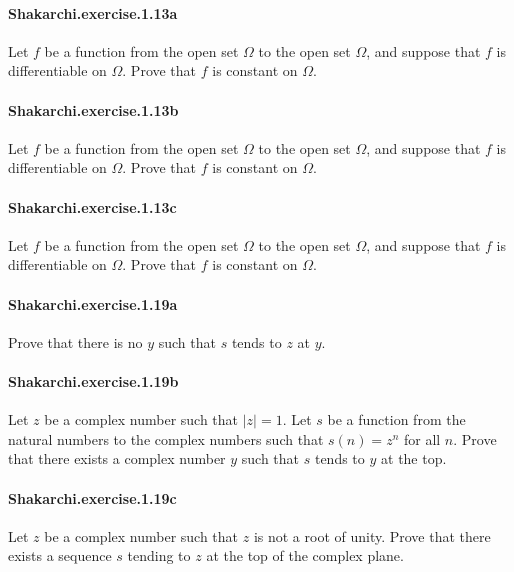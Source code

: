 \documentclass{article}
\begin{document}
\paragraph{Shakarchi.exercise.1.13a} Let $f$ be a function from the open set $\Omega$ to the open set $\Omega$, and suppose that $f$ is differentiable on $\Omega$. Prove that $f$ is constant on $\Omega$.

\paragraph{Shakarchi.exercise.1.13b} Let $f$ be a function from the open set $\Omega$ to the open set $\Omega$, and suppose that $f$ is differentiable on $\Omega$. Prove that $f$ is constant on $\Omega$.

\paragraph{Shakarchi.exercise.1.13c} Let $f$ be a function from the open set $\Omega$ to the open set $\Omega$, and suppose that $f$ is differentiable on $\Omega$. Prove that $f$ is constant on $\Omega$.

\paragraph{Shakarchi.exercise.1.19a} Prove that there is no $y$ such that $s$ tends to $z$ at $y$.

\paragraph{Shakarchi.exercise.1.19b} Let $z$ be a complex number such that $|z|=1$. Let $s$ be a function from the natural numbers to the complex numbers such that $s(n)=z^n$ for all $n$. Prove that there exists a complex number $y$ such that $s$ tends to $y$ at the top.

\paragraph{Shakarchi.exercise.1.19c} Let $z$ be a complex number such that $z$ is not a root of unity. Prove that there exists a sequence $s$ tending to $z$ at the top of the complex plane.
\end{document}
